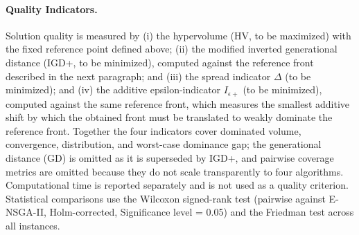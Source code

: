 \documentclass[11pt, a4paper]{article}
\begin{document}
\paragraph{Quality Indicators.}Solution quality is measured by (i) the
hypervolume (HV, to be maximized) with the fixed reference point defined above; (ii) the modified inverted generational distance (IGD+, to be minimized), computed against the reference front described in the next paragraph; and (iii) the spread indicator $\Delta$
(to be minimized); and (iv) the additive epsilon-indicator $I_{\epsilon+}$ (to be minimized), computed against the same reference
front, which measures the smallest additive shift by which the obtained
front must be translated to weakly dominate the reference front. Together the four indicators cover dominated volume, convergence,
distribution, and worst-case dominance gap; the generational distance
(GD) is omitted as it is superseded by IGD+, and pairwise coverage
metrics are omitted because they do not scale transparently to four
algorithms. Computational time is reported separately and is not used as a quality criterion. Statistical comparisons use the Wilcoxon
signed-rank test (pairwise against E-NSGA-II, Holm-corrected, Significance level = 0.05) and the Friedman test across all instances.
\end{document}
